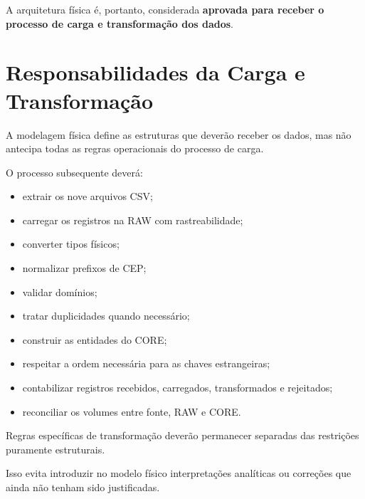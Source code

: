 \documentclass[12pt,a4paper]{article}
\begin{document}
{	A arquitetura física é, portanto, considerada
	\textbf{aprovada para receber o processo de carga e transformação dos
		dados}.
	
	\section{Responsabilidades da Carga e Transformação}
	
	A modelagem física define as estruturas que deverão receber os dados,
	mas não antecipa todas as regras operacionais do processo de carga.
	
	O processo subsequente deverá:
	
	\begin{itemize}[leftmargin=1.2cm]
		
		\item extrair os nove arquivos CSV;
		
		\item carregar os registros na RAW com rastreabilidade;
		
		\item converter tipos físicos;
		
		\item normalizar prefixos de CEP;
		
		\item validar domínios;
		
		\item tratar duplicidades quando necessário;
		
		\item construir as entidades do CORE;
		
		\item respeitar a ordem necessária para as chaves estrangeiras;
		
		\item contabilizar registros recebidos, carregados, transformados e
		rejeitados;
		
		\item reconciliar os volumes entre fonte, RAW e CORE.
		
	\end{itemize}
	
	Regras específicas de transformação deverão permanecer separadas das
	restrições puramente estruturais.
	
	Isso evita introduzir no modelo físico interpretações analíticas ou
	correções que ainda não tenham sido justificadas.
	
}
\end{document}
